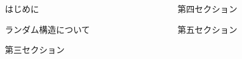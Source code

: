 \begin{frame}[t]{}
    
    \vspace{10mm}
    \begin{columns}[T]
      \begin{column}{.49\linewidth}
        \begin{block}{はじめに}
          
        \end{block}
        \begin{block}{ランダム構造について}
          
        \end{block}
        \begin{block}{第三セクション}
        \end{block}
        \end{column}
        \begin{column}{.49\linewidth}
        \begin{block}{第四セクション}
        \end{block}
        \begin{block}{第五セクション}
        \end{block}
      \end{column}
    \end{columns}
    \end{frame}